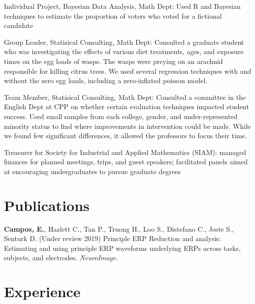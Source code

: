 \documentclass[]{deedy-resume-openfont}
\newenvironment{packed_enum}{
\begin{enumerate}
  \setlength{\itemsep}{1pt}
  \setlength{\parskip}{0pt}
  \setlength{\parsep}{0pt}
}{\end{enumerate}}
\begin{document}
\vspace{-.25em}
\begin{tightemize}
\item Individual Project, Bayesian Data Analysis, Math Dept: Used R and Bayesian techniques to estimate the proportion of voters who voted for a fictional candidate
\item Group Leader, Statisical Consulting, Math Dept: Consulted a graduate student who was investigating the effects of various diet treatments, ages, and exposure times on the egg loads of wasps. The wasps were preying on an arachnid responsible for killing citrus trees. We used several regression techniques with and without the zero egg loads, including a zero-inflated poisson model.
\item Team Member, Statisical Consulting, Math Dept: Consulted a committee in the English Dept at CPP on whether certain evaluation techniques impacted student success. Used small samples from each college, gender, and under-represented minority status to find where improvements in intervention could be made. While we found few significant differences, it allowed the professors to focus their time.
\item Treasurer for Society for Industrial and Applied Mathematics (SIAM): managed finances for planned meetings, trips, and guest speakers; facilitated panels aimed at encouraging undergraduates to pursue graduate degrees
\end{tightemize}
\sectionsep


\section{Publications} 
\begin{packed_enum} 
\item \textbf{Campos, E.}, Hazlett C., Tan P., Truong H., Loo S., Distefano C., Jeste S., Senturk D. (Under review 2019) Principle ERP Reduction and analysis: Estimating and using principle ERP waveforms underlying ERPs across tasks, subjects, and electrodes. \textit{NeuroImage}.
\end{packed_enum} 
\vspace{-1em}
\sectionsep

\section{Experience}
\end{document}
